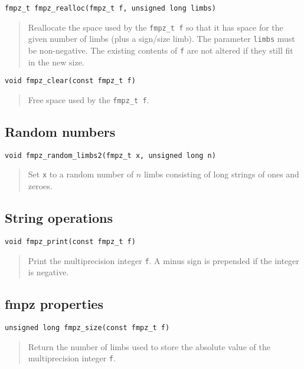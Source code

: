\documentclass[a4paper,10pt]{article}
\newcommand{\code}{\lstinline}
\begin{document}
\begin{lstlisting}
fmpz_t fmpz_realloc(fmpz_t f, unsigned long limbs)
\end{lstlisting}
\begin{quote}
Reallocate the space used by the \code{fmpz_t f} so that it has space for the given number of limbs (plus a sign/size limb). The parameter \code{limbs} must be non-negative. The existing contents of \code{f} are not altered if they still fit in the new size.
\end{quote}

\begin{lstlisting}
void fmpz_clear(const fmpz_t f)
\end{lstlisting}
\begin{quote}
Free space used by the \code{fmpz_t f}.
\end{quote}

\subsection{Random numbers}

\begin{lstlisting}
void fmpz_random_limbs2(fmpz_t x, unsigned long n)
\end{lstlisting}
\begin{quote}
Set \code{x} to a random number of $n$ limbs consisting of long strings of ones and zeroes.
\end{quote}

\subsection{String operations}

\begin{lstlisting}
void fmpz_print(const fmpz_t f)
\end{lstlisting}
\begin{quote}
Print the multiprecision integer \code{f}. A minus sign is prepended if the integer is negative.
\end{quote}

\subsection{fmpz properties}

\begin{lstlisting}
unsigned long fmpz_size(const fmpz_t f)
\end{lstlisting}
\begin{quote}
Return the number of limbs used to store the absolute value of the multiprecision integer \code{f}.
\end{quote}
\end{document}
